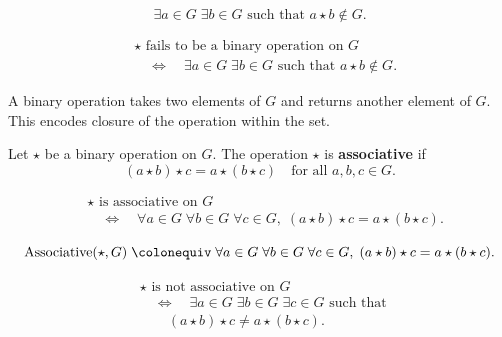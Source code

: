 \begin{remark*}
\[
\exists a \in G\;\exists b \in G \text{ such that } a \star b \notin G.
\]
\end{remark*}

\begin{remark*}
\[
\begin{aligned}
&\star \text{ fails to be a binary operation on } G \\
&\quad\Longleftrightarrow\quad
\exists a \in G\;\exists b \in G \text{ such that } a \star b \notin G.
\end{aligned}
\]
\end{remark*}

\begin{remark*}[Interpretation]
A binary operation takes two elements of $G$ and returns another element of $G$.
This encodes closure of the operation within the set.
\end{remark*}


\begin{tcolorbox}[title={Definition --- Associativity}]
\begin{definition}[Associativity]
\label{def:associativity}
Let $\star$ be a binary operation on $G$. The operation $\star$ is
\textbf{associative} if
\[
(a \star b) \star c = a \star (b \star c)
\quad \text{for all } a, b, c \in G.
\]
\end{definition}
\end{tcolorbox}

\begin{remark*}
\[
\begin{aligned}
&\star \text{ is associative on } G \\
&\quad\Longleftrightarrow\quad
\forall a \in G\;\forall b \in G\;\forall c \in G,\;
(a \star b) \star c = a \star (b \star c).
\end{aligned}
\]
\end{remark*}

\begin{remark*}
\[
\operatorname{Associative}(\star, G)
\;\colonequiv\;
\forall a \in G\;\forall b \in G\;\forall c \in G,\;
(a \star b) \star c = a \star (b \star c).
\]
\end{remark*}

\begin{remark*}
\[
\begin{aligned}
&\star \text{ is not associative on } G \\
&\quad\Longleftrightarrow\quad
\exists a \in G\;\exists b \in G\;\exists c \in G \text{ such that } \\
&\qquad (a \star b) \star c \ne a \star (b \star c).
\end{aligned}
\]
\end{remark*}

